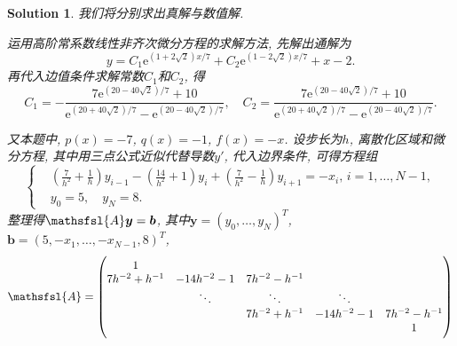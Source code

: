 \documentclass[a4paper, 12pt]{ctexart}
\theoremstyle{plain}
\theoremstyle{plain}
\theoremstyle{plain}
\theoremstyle{nonumberplain}
\newtheorem{solution}{Solution}
\newcommand*{\matr}[1]{\ensuremath{\mathsfsl{#1}}} %
\newcommand*{\me}{\mathrm{e}}
\newcommand*{\vect}[1]{\bm{#1}}
\begin{document}
    \begin{solution}
        我们将分别求出真解与数值解.

        运用高阶常系数线性非齐次微分方程的求解方法, 先解出通解为
        \begin{equation}
            y = C_{1}\me^{(1+2\sqrt{2})x/7}+C_{2}\me^{(1-2\sqrt{2})x/7}+x-2.
        \end{equation}
        再代入边值条件求解常数$C_{1}$和$C_{2}$, 得
        \begin{equation}
            C_{1}=-\frac{7\me^{(20-40\sqrt{2})/7}+10}{\me^{(20+40\sqrt{2})/7}-\me^{(20-40\sqrt{2})/7}},
            \quad
            C_{2}=\frac{7\me^{(20-40\sqrt{2})/7}+10}{\me^{(20+40\sqrt{2})/7}-\me^{(20-40\sqrt{2})/7}}.
        \end{equation}

        又本题中, $p(x)=-7$, $q(x)=-1$, $f(x)=-x$. 设步长为$h$, 离散化区域和微分方程, 其中用三点公式近似代替导数$y'$, 代入边界条件, 可得方程组
        \begin{equation}
            \left\{
            \begin{aligned}
                &\left(\frac{7}{h^{2}}+\frac{1}{h}\right)y_{i-1}-\left(\frac{14}{h^{2}}+1\right)y_{i}+\left(\frac{7}{h^{2}}-\frac{1}{h}\right)y_{i+1}=-x_{i},\,i=1,\dotsc,N-1,\\
                &y_{0}=5,\quad y_{N}=8.
            \end{aligned}
            \right.
        \end{equation}
        整理得$\matr{A}\vect{y}=\vect{b}$, 其中$\vect{y}=(y_{0},\dotsc,y_{N})^{T}$, $\vect{b}=(5, -x_{1}, \dotsc, -x_{N-1}, 8)^{T}$,
        \begin{equation}
            \matr{A}=
            \begin{pmatrix}
                1\\
                7h^{-2} + h^{-1} & -14h^{-2}-1 & 7h^{-2} - h^{-1}\\
                & \ddots & \ddots & \ddots\\
                & & 7h^{-2} + h^{-1} & -14h^{-2}-1 & 7h^{-2} - h^{-1}\\
                & & & & 1
            \end{pmatrix}
        \end{equation}


\end{solution}
\end{document}
